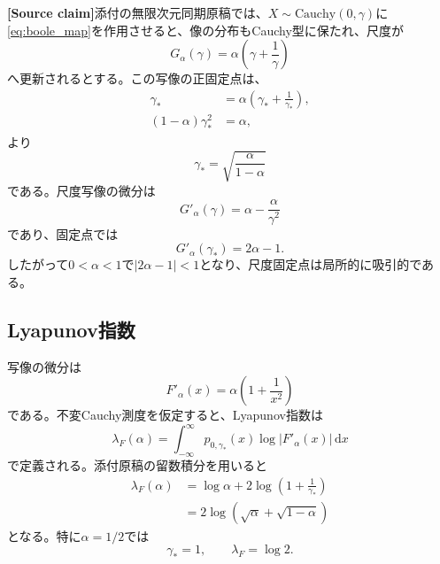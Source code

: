 \documentclass[a4paper,11pt,oneside,openany]{ltjsbook}
\newcommand{\dd}{\,\mathrm{d}}
\newcommand{\SourceClaim}{\textcolor{Brick}{\sffamily\bfseries [Source claim]}}
\begin{document}
\SourceClaim 添付の無限次元同期原稿では、\(X\sim\mathrm{Cauchy}(0,\gamma)\)に\cref{eq:boole_map}を作用させると、像の分布もCauchy型に保たれ、尺度が
\begin{equation}
  G_{\alpha}(\gamma)
  = \alpha\left(\gamma+\frac{1}{\gamma}\right)
  \label{eq:boole_scale_map}
\end{equation}
へ更新されるとする\cite{infinite_sync}。この写像の正固定点は、
\begin{align}
  \gamma_* &= \alpha\left(\gamma_*+\frac{1}{\gamma_*}\right),\\
  (1-\alpha)\gamma_*^2 &= \alpha,
\end{align}
より
\begin{equation}
  \gamma_*
  = \sqrt{\frac{\alpha}{1-\alpha}}
  \label{eq:boole_gamma_star}
\end{equation}
である。尺度写像の微分は
\begin{equation}
  G'_{\alpha}(\gamma)
  = \alpha-\frac{\alpha}{\gamma^2}
\end{equation}
であり、固定点では
\begin{equation}
  G'_{\alpha}(\gamma_*)=2\alpha-1.
  \label{eq:scale_stability}
\end{equation}
したがって\(0<\alpha<1\)で\(|2\alpha-1|<1\)となり、尺度固定点は局所的に吸引的である。

\subsection{Lyapunov指数}

写像の微分は
\begin{equation}
  F'_{\alpha}(x)
  = \alpha\left(1+\frac{1}{x^2}\right)
  \label{eq:boole_derivative}
\end{equation}
である。不変Cauchy測度を仮定すると、Lyapunov指数は
\begin{equation}
  \lambda_F(\alpha)
  = \int_{-\infty}^{\infty}
    p_{0,\gamma_*}(x)
    \log\left|F'_{\alpha}(x)\right|\dd x
  \label{eq:boole_lyapunov_integral}
\end{equation}
で定義される。添付原稿の留数積分を用いると
\begin{align}
  \lambda_F(\alpha)
  &= \log\alpha
     +2\log\left(1+\frac{1}{\gamma_*}\right)\\
  &=2\log\left(\sqrt\alpha+\sqrt{1-\alpha}\right)
  \label{eq:boole_lyapunov_closed}
\end{align}
となる\cite{infinite_sync}。特に\(\alpha=1/2\)では
\begin{equation}
  \gamma_*=1,\qquad \lambda_F=\log 2.
  \label{eq:maxchaos_boole}
\end{equation}
\end{document}
